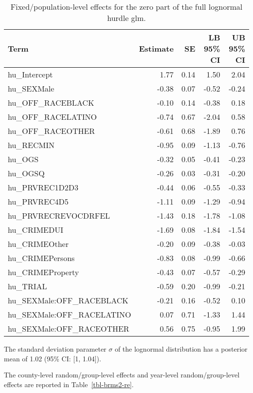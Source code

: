 \documentclass[
  letterpaper,
  DIV=11,
  numbers=noendperiod]{scrartcl}
\begin{document}
\hypertarget{tbl-brms-hurdle-model-summary-2-zero}{}
\begin{table}
\caption{\label{tbl-brms-hurdle-model-summary-2-zero}Fixed/population-level effects for the zero part of the full lognormal
hurdle glm. }\tabularnewline

\centering
\begin{tabular}{lrrrr}
\toprule
Term & Estimate & SE & LB 95\% CI & UB 95\% CI\\
\midrule
hu\_Intercept & 1.77 & 0.14 & 1.50 & 2.04\\
hu\_SEXMale & -0.38 & 0.07 & -0.52 & -0.24\\
hu\_OFF\_RACEBLACK & -0.10 & 0.14 & -0.38 & 0.18\\
hu\_OFF\_RACELATINO & -0.74 & 0.67 & -2.04 & 0.58\\
hu\_OFF\_RACEOTHER & -0.61 & 0.68 & -1.89 & 0.76\\
\addlinespace
hu\_RECMIN & -0.95 & 0.09 & -1.13 & -0.76\\
hu\_OGS & -0.32 & 0.05 & -0.41 & -0.23\\
hu\_OGSQ & -0.26 & 0.03 & -0.31 & -0.20\\
hu\_PRVREC1D2D3 & -0.44 & 0.06 & -0.55 & -0.33\\
hu\_PRVREC4D5 & -1.11 & 0.09 & -1.29 & -0.94\\
\addlinespace
hu\_PRVRECREVOCDRFEL & -1.43 & 0.18 & -1.78 & -1.08\\
hu\_CRIMEDUI & -1.69 & 0.08 & -1.84 & -1.54\\
hu\_CRIMEOther & -0.20 & 0.09 & -0.38 & -0.03\\
hu\_CRIMEPersons & -0.83 & 0.08 & -0.99 & -0.66\\
hu\_CRIMEProperty & -0.43 & 0.07 & -0.57 & -0.29\\
\addlinespace
hu\_TRIAL & -0.59 & 0.20 & -0.99 & -0.21\\
hu\_SEXMale:OFF\_RACEBLACK & -0.21 & 0.16 & -0.52 & 0.10\\
hu\_SEXMale:OFF\_RACELATINO & 0.07 & 0.71 & -1.33 & 1.44\\
hu\_SEXMale:OFF\_RACEOTHER & 0.56 & 0.75 & -0.95 & 1.99\\
\bottomrule
\end{tabular}
\end{table}

The standard deviation parameter \(\sigma\) of the lognormal
distribution has a posterior mean of 1.02 (95\% CI: {[}1, 1.04{]}).

The county-level random/group-level effects and year-level
random/group-level effects are reported in Table~\ref{tbl-brms2-re}.
\end{document}
